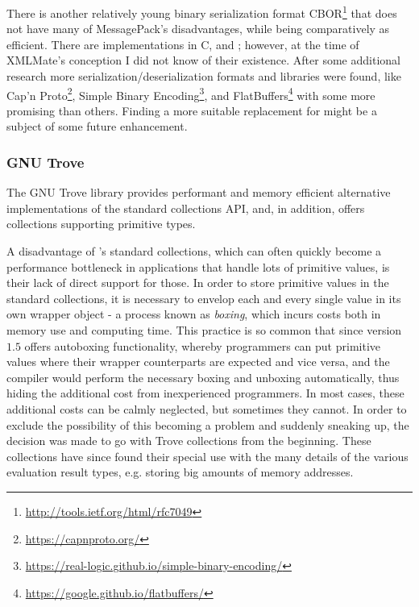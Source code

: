 There is another relatively young binary serialization format
{\small CBOR}\footnote{\url{http://tools.ietf.org/html/rfc7049}} that does not have many of {\small
MessagePack's} disadvantages, while being comparatively as efficient.
There are implementations in {\small C}, \python and \java; however, at the time of {\small XMLMate's}
conception I did not know of their existence. 
After some additional research more serialization/deserialization formats and libraries were found, like
{\small Cap'n Proto}\footnote{\url{https://capnproto.org/}},
{\small Simple Binary Encoding}\footnote{\url{https://real-logic.github.io/simple-binary-encoding/}}, and
{\small FlatBuffers}\footnote{\url{https://google.github.io/flatbuffers/}} with some more promising than
others. Finding a more suitable replacement for \msgpack might be a subject of some future enhancement.
\tocless\subsubsection{GNU Trove}
\label{sec:trove}
The GNU Trove \java library provides performant and memory efficient alternative implementations of the
standard \java collections API, and, in addition, offers collections supporting primitive types. 

A disadvantage of \java's standard collections, which can often quickly become a performance bottleneck in
applications that handle lots of primitive values, is their lack of direct support for those. In
order to store primitive values in the standard collections, it is necessary to envelop each and every single
value in its own wrapper object - a process known as \emph{boxing}, which incurs costs both in memory use and
computing time. This practice is so common that since version $1.5$ \java offers autoboxing functionality,
whereby programmers can put primitive values where their wrapper counterparts are expected and vice versa, and
the \java compiler would perform the necessary boxing and unboxing automatically, thus hiding the additional
cost from inexperienced programmers. In most cases, these additional costs can be calmly neglected, but
sometimes they cannot. In order to exclude the possibility of this becoming a problem and suddenly sneaking
up, the decision was made to go with Trove collections from the beginning. These collections have since found
their special use with the many details of the various evaluation result types, e.g. storing big amounts of
memory addresses.